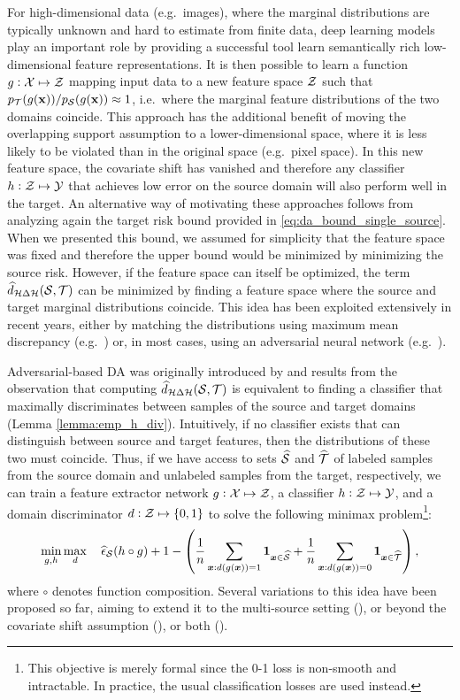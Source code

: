 For high-dimensional data (e.g.\ images), where the marginal distributions are typically unknown and hard to estimate from finite data, deep learning models play an important role by providing a successful tool learn semantically rich low-dimensional feature representations. It is then possible to learn a function $g:{\mathcal{X}} \mapsto {\mathcal{Z}}$ mapping input data to a new feature space ${\mathcal{Z}}$ such that $p_{{\mathcal{T}}}(g({\mathbf{x}}))/p_{{\mathcal{S}}}(g({\mathbf{x}})) \approx 1$, i.e.\ where the marginal feature distributions of the two domains coincide. This approach has the additional benefit of moving the overlapping support assumption to a lower-dimensional space, where it is less likely to be violated than in the original space (e.g.\ pixel space). In this new feature space, the covariate shift has vanished and therefore any classifier $h:{\mathcal{Z}} \mapsto {\mathcal{Y}}$ that achieves low error on the source domain will also perform well in the target. An alternative way of motivating these approaches follows from analyzing again the target risk bound provided in \eqref{eq:da_bound_single_source}. When we presented this bound, we assumed for simplicity that the feature space was fixed and therefore the upper bound would be minimized by minimizing the source risk. However, if the feature space can itself be optimized, the term $\widehat{d}_{{\mathcal{H}} \Delta {\mathcal{H}}}({\mathcal{S}}, {\mathcal{T}})$ can be minimized by finding a feature space where the source and target marginal distributions coincide. This idea has been exploited extensively in recent years, either by matching the distributions using maximum mean discrepancy (e.g.\ \citet{Long2015,Guo2018}) or, in most cases, using an adversarial neural network (e.g.\ \citet{Zhao2018,Ganin2015,Pei2018,Sebag2019}).

Adversarial-based DA was originally introduced by \citet{Ganin2015} and results from the observation that
computing $\widehat{d}_{{\mathcal{H}} \Delta {\mathcal{H}}}({\mathcal{S}}, {\mathcal{T}})$ is equivalent to finding a classifier that maximally discriminates between samples of the source and target domains (Lemma \ref{lemma:emp_h_div}). Intuitively, if no classifier exists that can distinguish between source and target features, then the distributions of these two must coincide. Thus, if we have access to sets $\widehat{{\mathcal{S}}}$ and $\widehat{{\mathcal{T}}}$ of labeled samples from the source domain and unlabeled samples from the target, respectively, we can train a feature extractor network $g:{\mathcal{X}} \mapsto {\mathcal{Z}}$, a classifier $h:{\mathcal{Z}} \mapsto {\mathcal{Y}}$, and a domain discriminator $d:{\mathcal{Z}} \mapsto \{0,1\}$ to solve the following minimax problem\footnote{This objective is merely formal since the 0-1 loss is non-smooth and intractable. In practice, the usual classification losses are used instead.}:
\begin{equation}
	\label{eq:dann_obj}
	\min_{g,h} \max_d \quad \widehat{\epsilon}_{\mathcal{S}}(h \circ g) + 1 - \left(\frac{1}{n} \sum_{{\bm{x}}: d(g({\bm{x}}))=1} \bm{1}_{{\bm{x}} \in \widehat{{\mathcal{S}}}} + \frac{1}{n} \sum_{{\bm{x}}: d(g({\bm{x}}))=0} \bm{1}_{{\bm{x}} \in \widehat{{\mathcal{T}}}}\right),
\end{equation}
where $\circ$ denotes function composition. Several variations to this idea have been proposed so far, aiming to extend it to the multi-source setting (\citet{Zhao2018}), or beyond the covariate shift assumption (\citet{Pei2018}), or both (\citet{Sebag2019}).

